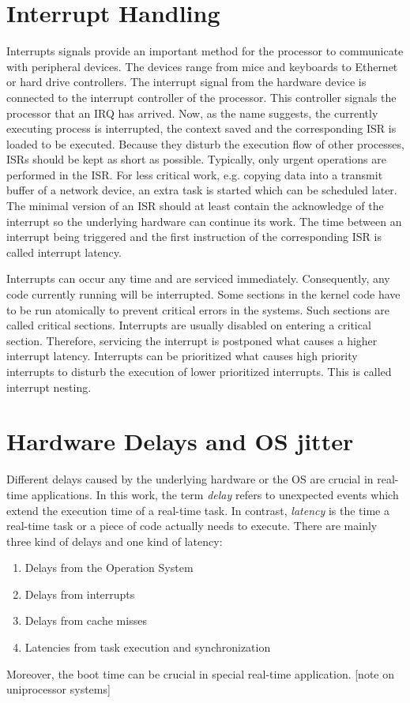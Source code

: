 \section{Interrupt Handling}\label{s_interrupt_handling}
Interrupts signals provide an important method for the processor to communicate with peripheral devices.
The devices range from mice and keyboards to Ethernet or hard drive controllers.
The interrupt signal from the hardware device is connected to the interrupt controller of the processor. 
This controller signals the processor that an \ac{IRQ} has arrived.
Now, as the name suggests, the currently executing process is interrupted, the context saved and the corresponding \ac{ISR} is loaded to be executed.
Because they disturb the execution flow of other processes, \acp{ISR} should be kept as short as possible.
Typically, only urgent operations are performed in the \ac{ISR}. 
For less critical work, e.g. copying data into a transmit buffer of a network device, an extra task is started which can be scheduled later.
The minimal version of an \ac{ISR} should at least contain the acknowledge of the interrupt so the underlying hardware can continue its work.
The time between an interrupt being triggered and the first instruction of the corresponding \ac{ISR} is called interrupt latency.
\par
Interrupts can occur any time and are serviced immediately.
Consequently, any code currently running will be interrupted.
Some sections in the kernel code have to be run atomically to prevent critical errors in the systems.
Such sections are called critical sections.
Interrupts are usually disabled on entering a critical section.
Therefore, servicing the interrupt is postponed what causes a higher interrupt latency.
Interrupts can be prioritized what causes high priority interrupts to disturb the execution of lower prioritized interrupts.
This is called interrupt nesting.
 
\section{Hardware Delays and \ac{OS} jitter}\label{s_hardware_delays_and_os_jitter}
Different delays caused by the underlying hardware or the \ac{OS} are crucial in real-time applications.
In this work, the term \textit{delay} refers to unexpected events which extend the execution time of a real-time task.
In contrast, \textit{latency} is the time a real-time task or a piece of code actually needs to execute. 
There are mainly three kind of delays and one kind of latency:
\begin{enumerate}
	\item Delays from the Operation System
	\item Delays from interrupts
	\item Delays from cache misses
	\item Latencies from task execution and synchronization
\end{enumerate}
Moreover, the boot time can be crucial in special real-time application.
[note on uniprocessor systems]

